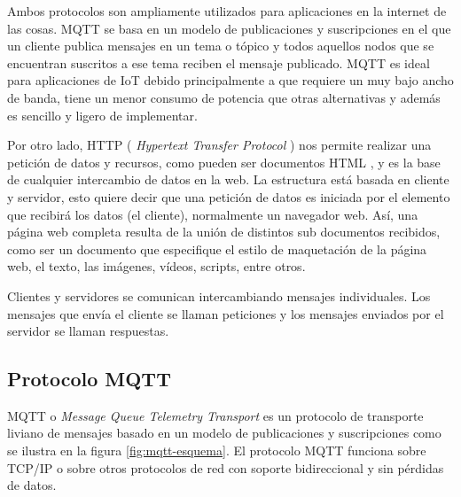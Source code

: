 Ambos protocolos son ampliamente utilizados para aplicaciones en la internet de las cosas.  MQTT se basa en un modelo de publicaciones y suscripciones en el que un cliente publica mensajes en un tema o tópico y todos aquellos nodos que se encuentran suscritos a ese tema reciben el mensaje publicado. MQTT es ideal para aplicaciones de IoT debido principalmente a que requiere un muy bajo ancho de banda, tiene un menor consumo de potencia que otras alternativas y además es sencillo y ligero de implementar. 

Por otro lado, HTTP \citep{WEBSITE:14} (\textit{ Hypertext Transfer Protocol} ) nos permite realizar una petición de datos y recursos, como pueden ser documentos HTML \citep{BOOK:2}, y es la base de cualquier intercambio de datos en la web. La estructura está basada en cliente y servidor, esto quiere decir que una petición de datos es iniciada por el elemento que recibirá los datos (el cliente), normalmente un navegador web.   Así,  una página web completa resulta de la unión de distintos sub documentos recibidos, como ser un documento que especifique el estilo de maquetación de la página web, el texto, las imágenes, vídeos, scripts, entre otros. 

Clientes y servidores se comunican intercambiando mensajes individuales. Los mensajes que envía el cliente se llaman peticiones y los mensajes enviados por el servidor se llaman respuestas.


\subsection{Protocolo MQTT}
\label{mqtt-section}
MQTT o \textit{ Message Queue Telemetry Transport} es un protocolo de transporte liviano de mensajes basado en un modelo de publicaciones y suscripciones como se ilustra en la figura \ref{fig:mqtt-esquema}. El protocolo MQTT funciona sobre TCP/IP o sobre otros protocolos de red con soporte bidireccional y sin pérdidas de datos.


